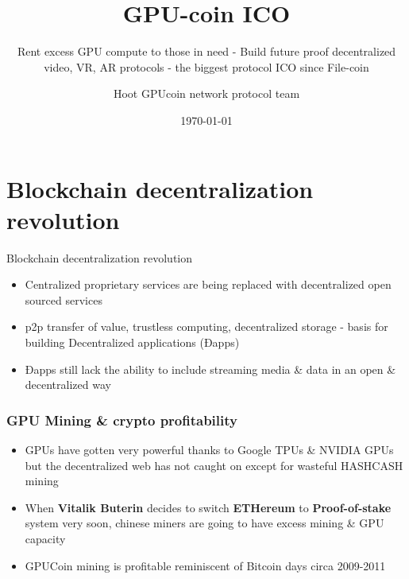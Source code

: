 \documentclass[10pt]{beamer}
\title{ GPU-coin ICO }
\subtitle{Rent excess GPU compute to those in need - Build future proof decentralized video, VR, AR protocols - the biggest protocol ICO since File-coin}
\date{\today}
\author{Hoot GPUcoin network protocol team}
\institute{Hoot GPUcoin Foundation}
\begin{document}
\maketitle


\section{Blockchain decentralization revolution}
\begin{frame}[fragile]{Blockchain decentralization revolution}
 \begin{itemize}[<+-| alert@+>]%
	 
\item Centralized proprietary services are being replaced with decentralized open sourced services
\item p2p transfer of value, trustless computing, decentralized storage - basis for building Decentralized applications (Ðapps)
 \item Ðapps still lack the ability to include streaming media \& data in an open \& decentralized way
\end{itemize}

\end{frame}

\begin{frame}[t]\frametitle{GPU Mining \& crypto profitability}
    
\begin{itemize}[<+-| alert@+>]
\item GPUs have gotten very powerful thanks to Google TPUs \& NVIDIA GPUs but the decentralized web has not caught on except for wasteful HASHCASH mining
\item When \textbf{Vitalik Buterin} decides to switch \textbf{ETHereum} to \textbf{Proof-of-stake} system very soon, chinese miners are going to have excess mining \& GPU capacity
\item GPUCoin mining is profitable reminiscent of Bitcoin days circa 2009-2011
\end{itemize}

\end{frame}
\end{document}
